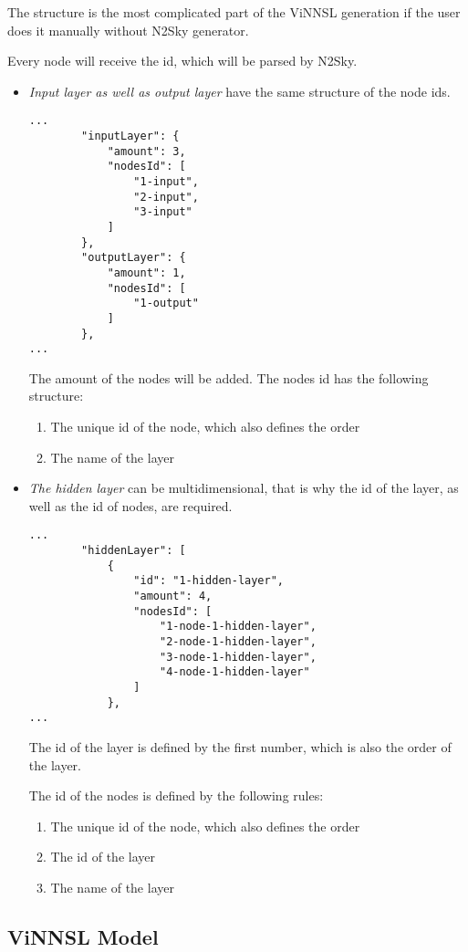 The structure is the most complicated part of the ViNNSL generation if the user does it manually without N2Sky generator. 

Every node will receive the id, which will be parsed by N2Sky.

\begin{itemize}
\item \emph{Input layer as well as output layer} have the same structure of the node ids.
 \begin{lstlisting}[caption=ViNNSL generated layers]
...
		"inputLayer": {
			"amount": 3,
			"nodesId": [
				"1-input",
				"2-input",
				"3-input"
			]
		},
		"outputLayer": {
			"amount": 1,
			"nodesId": [
				"1-output"
			]
		},
...
\end{lstlisting}

The amount of the nodes will be added. The nodes id has the following structure: 
\begin{enumerate}
\item The unique id of the node, which also defines the order
\item The name of the layer
\end{enumerate}
\item \emph{The hidden layer} can be multidimensional, that is why the id of the layer, as well as the id of nodes, are required.


 \begin{lstlisting}[caption=ViNNSL generated hidden layers]
...
		"hiddenLayer": [
			{
				"id": "1-hidden-layer",
				"amount": 4,
				"nodesId": [
					"1-node-1-hidden-layer",
					"2-node-1-hidden-layer",
					"3-node-1-hidden-layer",
					"4-node-1-hidden-layer"
				]
			},
...
\end{lstlisting}

The id of the layer is defined by the first number, which is also the order of the layer.

The id of the nodes is defined by the following rules:
\begin{enumerate}
\item The unique id of the node, which also defines the order
\item The id of the layer
\item The name of the layer
\end{enumerate}

\end{itemize}


\subsection{ViNNSL Model}\label{ViNNSL Model}

